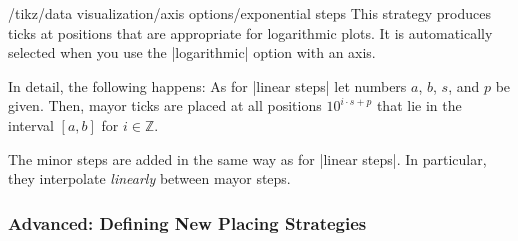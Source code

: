 \begin{key}{/tikz/data visualization/axis options/exponential steps}
  This strategy produces ticks at positions that are appropriate for
  logarithmic plots. It is automatically selected when you use the
  |logarithmic| option with an axis.

  In detail, the following happens: As for |linear steps| let numbers
  $a$, $b$, $s$, and $p$ be given. Then, mayor ticks are placed at all
  positions $10^{i\cdot s+p}$ that lie in the interval $[a,b]$ for $i
  \in \mathbb Z$.

  The minor steps are added in the same way as for |linear steps|. In
  particular, they interpolate \emph{linearly} between mayor steps.

\begin{codeexample}[]
\end{codeexample}
\end{key}



\subsubsection{Advanced: Defining New Placing Strategies}

